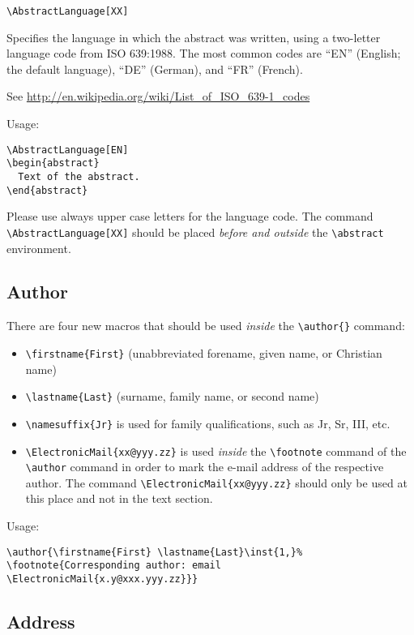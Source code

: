\documentclass{article}
\begin{document}
\verb+\AbstractLanguage[XX]+


Specifies the language in which the abstract was written, using a two-letter
language code from ISO 639:1988. The most common codes are ``EN''
(English; the default language), ``DE'' (German), and ``FR'' (French). 

See \url{http://en.wikipedia.org/wiki/List_of_ISO_639-1_codes}

Usage:
\begin{verbatim}
\AbstractLanguage[EN]
\begin{abstract}
  Text of the abstract.
\end{abstract}
\end{verbatim}
Please  use always upper case letters for the language code. The command
\verb+\AbstractLanguage[XX]+ should be placed \emph{before and outside} the \verb+\abstract+ environment.



\subsection{Author}

There are four new macros that should be used \emph{inside} the
\verb+\author{}+ command:
\begin{itemize}
\item \verb+\firstname{First}+ (unabbreviated forename, given name, or Christian name)

\item \verb+\lastname{Last}+ (surname, family name, or second name)

\item \verb+\namesuffix{Jr}+ is used for family qualifications, such as 
Jr, Sr, III, etc.
\item \verb+\ElectronicMail{xx@yyy.zz}+ is used \emph{inside} the
  \verb+\footnote+ command of the \verb+\author+ command in order to mark the
  e-mail address of the respective author. The command
  \verb+\ElectronicMail{xx@yyy.zz}+ should only be used at this place and not
  in the text section.
\end{itemize}
Usage:
\begin{verbatim}
\author{\firstname{First} \lastname{Last}\inst{1,}%
\footnote{Corresponding author: email \ElectronicMail{x.y@xxx.yyy.zz}}}
\end{verbatim}


\subsection{Address}
\end{document}
